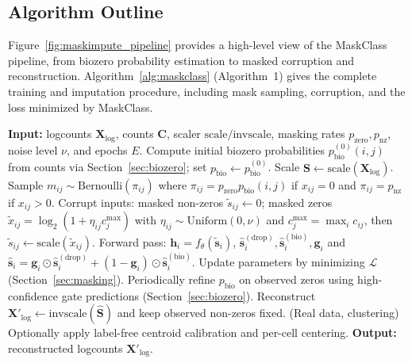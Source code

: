 \documentclass[sigconf,review]{acmart}
\theoremstyle{plain}
\theoremstyle{definition}
\theoremstyle{remark}
\begin{document}
\subsection{Algorithm Outline}
Figure~\ref{fig:maskimpute_pipeline} provides a high-level view of the MaskClass
pipeline, from biozero probability estimation to masked corruption and
reconstruction. Algorithm~\ref{alg:maskclass} (Algorithm~1) gives the complete
training and imputation procedure, including mask sampling, corruption, and the
loss minimized by MaskClass.

\begin{algorithm}[H]
\caption{MaskClass training and imputation.}
\label{alg:maskclass}
\begin{algorithmic}[1]
\raggedright
\STATE \textbf{Input:} logcounts $\mathbf{X}_{\log}$, counts $\mathbf{C}$,
scaler $\mathrm{scale}/\mathrm{invscale}$, masking rates
$p_{\mathrm{zero}},p_{\mathrm{nz}}$, noise level $\nu$, and epochs $E$.
\STATE Compute initial biozero probabilities $p^{(0)}_{\mathrm{bio}}(i,j)$ from
counts via Section~\ref{sec:biozero}; set
$p_{\mathrm{bio}}\leftarrow p^{(0)}_{\mathrm{bio}}$.
\STATE Scale $\mathbf{S}\leftarrow\mathrm{scale}(\mathbf{X}_{\log})$.
\STATE Sample $m_{ij}\sim\mathrm{Bernoulli}(\pi_{ij})$ where
$\pi_{ij}=p_{\mathrm{zero}}p_{\mathrm{bio}}(i,j)$ if $x_{ij}=0$ and
$\pi_{ij}=p_{\mathrm{nz}}$ if $x_{ij}>0$.
\STATE Corrupt inputs: masked non-zeros $\tilde{s}_{ij}\leftarrow 0$; masked
zeros $\tilde{x}_{ij}=\log_2(1+\eta_{ij}c^{\max}_j)$ with
$\eta_{ij}\sim\mathrm{Uniform}(0,\nu)$ and $c^{\max}_j=\max_i c_{ij}$, then
$\tilde{s}_{ij}\leftarrow\mathrm{scale}(\tilde{x}_{ij})$.
\STATE Forward pass: $\mathbf{h}_i=f_\theta(\tilde{\mathbf{s}}_i)$,
$\hat{\mathbf{s}}^{(\mathrm{drop})}_i,
\hat{\mathbf{s}}^{(\mathrm{bio})}_i,\mathbf{g}_i$ and
$\hat{\mathbf{s}}_i=\mathbf{g}_i\odot\hat{\mathbf{s}}^{(\mathrm{drop})}_i+(1-\mathbf{g}_i)\odot\hat{\mathbf{s}}^{(\mathrm{bio})}_i$.
\STATE Update parameters by minimizing $\mathcal{L}$ (Section~\ref{sec:masking}).
\ENDFOR
\STATE Periodically refine $p_{\mathrm{bio}}$ on observed zeros using
high-confidence gate predictions (Section~\ref{sec:biozero}).
\ENDFOR
\STATE Reconstruct $\mathbf{X}'_{\log}\leftarrow\mathrm{invscale}(\hat{\mathbf{S}})$
and keep observed non-zeros fixed.
\STATE (Real data, clustering) Optionally apply label-free centroid calibration
and per-cell centering.
\STATE \textbf{Output:} reconstructed logcounts $\mathbf{X}'_{\log}$.
\end{algorithmic}
\end{algorithm}
\FloatBarrier
\end{document}
